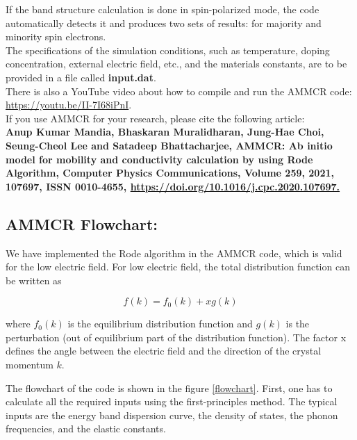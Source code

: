\documentclass[12pt]{article}
\begin{document}
If the band structure calculation is done in spin-polarized mode, the code automatically detects it and produces two sets of results: for majority and minority spin electrons. \\

The specifications of the simulation conditions, such as temperature, doping concentration, external electric field, etc., and the materials constants, are to be provided in a file called \textbf{input.dat}. \\

There is also a YouTube video about how to compile and run the AMMCR code: \\ \href{https://youtu.be/II-7I68iPnI}{https://youtu.be/II-7I68iPnI}. \\ 

If you use AMMCR for your research, please cite the following article: \\
\textbf{Anup Kumar Mandia, Bhaskaran Muralidharan, Jung-Hae Choi, Seung-Cheol Lee and Satadeep Bhattacharjee, AMMCR: Ab initio model for mobility and conductivity calculation by using Rode Algorithm, Computer Physics Communications, Volume 259, 2021, 107697, ISSN 0010-4655, \href{https://doi.org/10.1016/j.cpc.2020.107697}{ https://doi.org/10.1016/j.cpc.2020.107697.}} \\ 

\subsection{AMMCR Flowchart:}

We have implemented the Rode algorithm in the AMMCR code, which is valid for the low electric field. For low electric field, the total distribution function can be written as

\begin{equation} \label{equilibrium_distribution}
    f(k) = f_0(k) + x g(k)
\end{equation}

where $f_0(k)$ is the equilibrium distribution function and $g(k)$ is the perturbation (out of equilibrium part of the distribution function). The factor x defines the angle between the electric field and the direction of the crystal momentum $k$.

The flowchart of the code is shown in the figure \ref{flowchart}. First, one has to calculate all the required inputs using the first-principles method. The typical inputs are the energy band dispersion curve, the density of states, the phonon frequencies, and the elastic constants.
\end{document}
